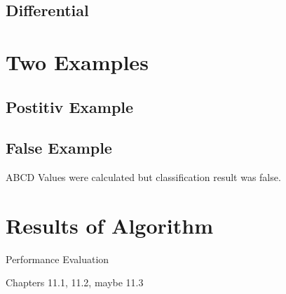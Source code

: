 \subsection{Differential}

\section{Two Examples}
\subsection{Postitiv Example}

\subsection{False Example}

ABCD Values were calculated but classification result was false.

\section{Results of Algorithm}

Performance Evaluation

Chapters 11.1, 11.2, maybe 11.3